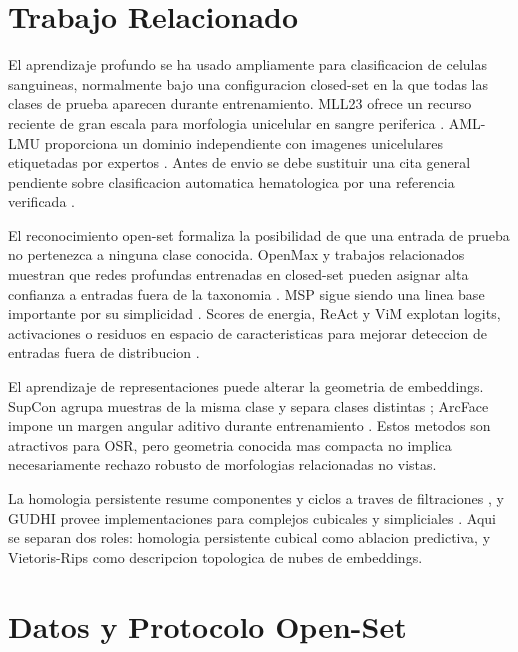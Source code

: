 \documentclass[11pt]{article}
\begin{document}
\section{Trabajo Relacionado}

El aprendizaje profundo se ha usado ampliamente para clasificacion de celulas sanguineas, normalmente bajo una configuracion closed-set en la que todas las clases de prueba aparecen durante entrenamiento. MLL23 ofrece un recurso reciente de gran escala para morfologia unicelular en sangre periferica \cite{mll23_nature_2025,mll23_zenodo_2024}. AML-LMU proporciona un dominio independiente con imagenes unicelulares etiquetadas por expertos \cite{aml_lmu_tcia_2019}. Antes de envio se debe sustituir una cita general pendiente sobre clasificacion automatica hematologica por una referencia verificada \cite{TODO_hematology_ai_review}.

El reconocimiento open-set formaliza la posibilidad de que una entrada de prueba no pertenezca a ninguna clase conocida. OpenMax y trabajos relacionados muestran que redes profundas entrenadas en closed-set pueden asignar alta confianza a entradas fuera de la taxonomia \cite{bendale2016openmax}. MSP sigue siendo una linea base importante por su simplicidad \cite{hendrycks2017baseline}. Scores de energia, ReAct y ViM explotan logits, activaciones o residuos en espacio de caracteristicas para mejorar deteccion de entradas fuera de distribucion \cite{liu2020energy,sun2021react,wang2022vim}.

El aprendizaje de representaciones puede alterar la geometria de embeddings. SupCon agrupa muestras de la misma clase y separa clases distintas \cite{khosla2020supcon}; ArcFace impone un margen angular aditivo durante entrenamiento \cite{deng2019arcface}. Estos metodos son atractivos para OSR, pero geometria conocida mas compacta no implica necesariamente rechazo robusto de morfologias relacionadas no vistas.

La homologia persistente resume componentes y ciclos a traves de filtraciones \cite{edelsbrunner2002persistence,carlsson2009topology}, y GUDHI provee implementaciones para complejos cubicales y simpliciales \cite{maria2014gudhi}. Aqui se separan dos roles: homologia persistente cubical como ablacion predictiva, y Vietoris-Rips como descripcion topologica de nubes de embeddings.

\section{Datos y Protocolo Open-Set}
\end{document}
